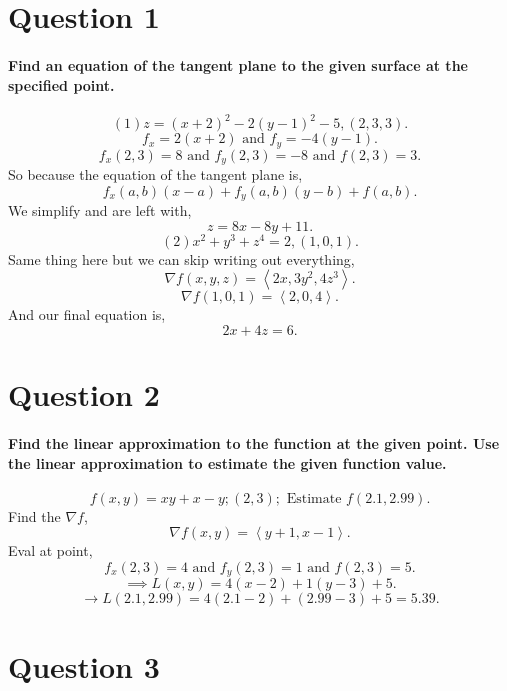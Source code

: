 \section{Question 1}%
\label{sec: Question 1 }
\paragraph{Find an equation of the tangent plane to the given surface at the specified point.}
\[
	\left( 1 \right) z=\left( x+2 \right) ^2-2\left( y-1 \right) ^2-5, \left( 2,3,3 \right) 
.\] 
\[
f_x = 2\left( x+2 \right) \text{ and }f_y = -4\left( y-1 \right)
.\] 
\[
f_x\left( 2,3 \right) = 8 \text{ and }f_y\left( 2,3 \right) = -8\text{ and }f\left( 2,3 \right) = 3
.\] 
So because the equation of the tangent plane is,
\[
f_x\left( a,b \right) \left( x-a \right) +f_y\left( a,b \right) \left( y-b \right) +f\left( a,b \right) 
.\] 
We simplify and are left with,
\[
z=8x-8y+11
.\] 
\[
	\left( 2 \right) x^2+y^3+z^{ 4 }=2, \left( 1,0,1 \right) 
.\] 
Same thing here but we can skip writing out everything,
\[
\nabla f\left( x,y,z \right) = \left< 2x,3y^2, 4z^3 \right>
.\] 
\[
\nabla f\left( 1,0,1 \right) = \left< 2,0,4 \right>
.\] 
And our final equation is,
\[
2x+4z=6
.\] 
\section{Question 2}%
\label{sec: Question 2 }
\paragraph{Find the linear approximation to the function at the given point. Use the linear approximation to estimate the given function value.}
\[
f\left( x,y \right) = xy+x-y;\left( 2,3 \right) ;\text{ Estimate }f\left( 2.1,2.99 \right) 
.\] 
Find the $ \nabla f $,
\[
\nabla f\left( x,y \right) = \left< y+1, x-1 \right> 
.\] 
Eval at point,
\[
f_x\left( 2,3 \right) =4\text{ and }f_y\left( 2,3 \right) =1\text{ and }f\left( 2,3 \right) = 5
.\] 
\[
\implies L\left( x,y \right) = 4\left( x-2 \right) +1\left( y-3 \right) +5
.\] 
\[
\to L\left( 2.1,2.99 \right) = 4\left( 2.1-2 \right) +\left( 2.99-3 \right) +5 = 5.39
.\] 
\section{Question 3}%
\label{sec: Question 3 }
